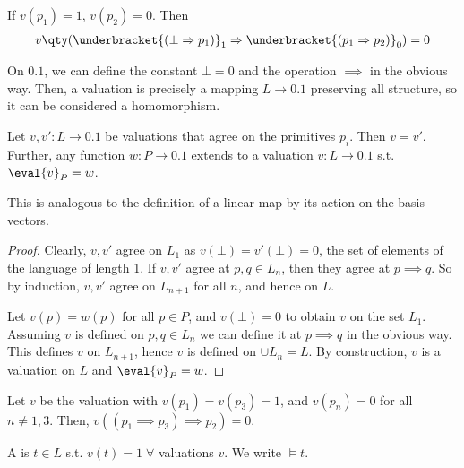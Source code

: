 \begin{example}
    If $v(p_1) = 1$, $v(p_2) = 0$.
    Then \begin{align*}
        v\qty( \underbracket{(\bot \implies p_1)}_{1} \implies \underbracket{(p_1 \implies p_2)}_{0}) = 0
    \end{align*}
\end{example}

\begin{remark}
    On $\qty{0,1}$, we can define the constant $\bot = 0$ and the operation $\implies$ in the obvious way.
    Then, a valuation is precisely a mapping $L \to \qty{0,1}$ preserving all structure, so it can be considered a homomorphism.
\end{remark}

\begin{proposition}
    Let $v, v' \colon L \to \qty{0,1}$ be valuations that agree on the primitives $p_i$.
    Then $v = v'$.
    Further, any function $w \colon P \to \qty{0,1}$ extends to a valuation $v : L \to \qty{0, 1}$ s.t. $\eval{v}_P = w$.
\end{proposition}

\begin{remark}
    This is analogous to the definition of a linear map by its action on the basis vectors.
\end{remark}

\begin{proof}
    Clearly, $v, v'$ agree on $L_1$ as $v(\bot) = v'(\bot) = 0$, the set of elements of the language of length 1.
    If $v, v'$ agree at $p, q \in L_n$, then they agree at $p \implies q$.
    So by induction, $v, v'$ agree on $L_{n+1}$ for all $n$, and hence on $L$.

    Let $v(p) = w(p)$ for all $p \in P$, and $v(\bot) = 0$ to obtain $v$ on the set $L_1$.
    Assuming $v$ is defined on $p, q \in L_n$ we can define it at $p \implies q$ in the obvious way.
    This defines $v$ on $L_{n+1}$, hence $v$ is defined on $\cup L_n = L$.
    By construction, $v$ is a valuation on $L$ and $\eval{v}_P = w$.
\end{proof}

\begin{example}
    Let $v$ be the valuation with $v(p_1) = v(p_3) = 1$, and $v(p_n) = 0$ for all $n \neq 1, 3$.
    Then, $v((p_1 \implies p_3) \implies p_2) = 0$.
\end{example}

\begin{definition}[Tautology]
    A  is $t \in L$ s.t. $v(t) = 1 \; \forall$ valuations $v$.
    We write $\models t$.
\end{definition}

